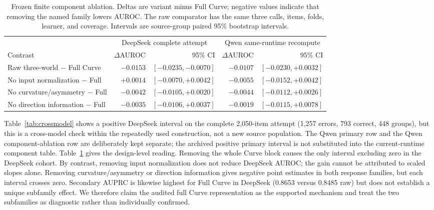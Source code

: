 \documentclass[11pt]{article}
\begin{document}
\begin{table}[t]
\centering
\small
\caption{Frozen finite component ablation. Deltas are variant minus Full Curve; negative values indicate that removing the named family lowers AUROC. The raw comparator has the same three calls, items, folds, learner, and coverage. Intervals are source-group paired 95\% bootstrap intervals.}
\label{tab:components}
\begin{tabular}{lrrrr}
\toprule
& \multicolumn{2}{c}{DeepSeek complete attempt} & \multicolumn{2}{c}{Qwen same-runtime recompute} \\
\cmidrule(lr){2-3}\cmidrule(lr){4-5}
Contrast & $\Delta$AUROC & 95\% CI & $\Delta$AUROC & 95\% CI \\
\midrule
Raw three-world $-$ Full Curve & $-0.0153$ & $[-0.0235,-0.0070]$ & $-0.0107$ & $[-0.0230,+0.0032]$ \\
No input normalization $-$ Full & $+0.0014$ & $[-0.0070,+0.0042]$ & $-0.0055$ & $[-0.0152,+0.0042]$ \\
No curvature/asymmetry $-$ Full & $-0.0042$ & $[-0.0105,+0.0020]$ & $-0.0044$ & $[-0.0112,+0.0026]$ \\
No direction information $-$ Full & $-0.0035$ & $[-0.0106,+0.0037]$ & $-0.0019$ & $[-0.0115,+0.0078]$ \\
\bottomrule
\end{tabular}
\end{table}

Table~\ref{tab:crossmodel} shows a positive DeepSeek interval on the complete 2,050-item attempt (1,257 errors, 793 correct, 448 groups), but this is a cross-model check within the repeatedly used construction, not a new source population. The Qwen primary row and the Qwen component-ablation row are deliberately kept separate; the archived positive primary interval is not substituted into the current-runtime component table. Table~\ref{tab:components} gives the design-level reading. Removing the whole Curve block causes the only interval excluding zero in the DeepSeek cohort. By contrast, removing input normalization does not reduce DeepSeek AUROC; the gain cannot be attributed to scaled slopes alone. Removing curvature/asymmetry or direction information gives negative point estimates in both response families, but each interval crosses zero. Secondary AUPRC is likewise highest for Full Curve in DeepSeek (0.8653 versus 0.8485 raw) but does not establish a unique subfamily effect. We therefore claim the audited full Curve representation as the supported mechanism and treat the two subfamilies as diagnostic rather than individually confirmed.
\end{document}
